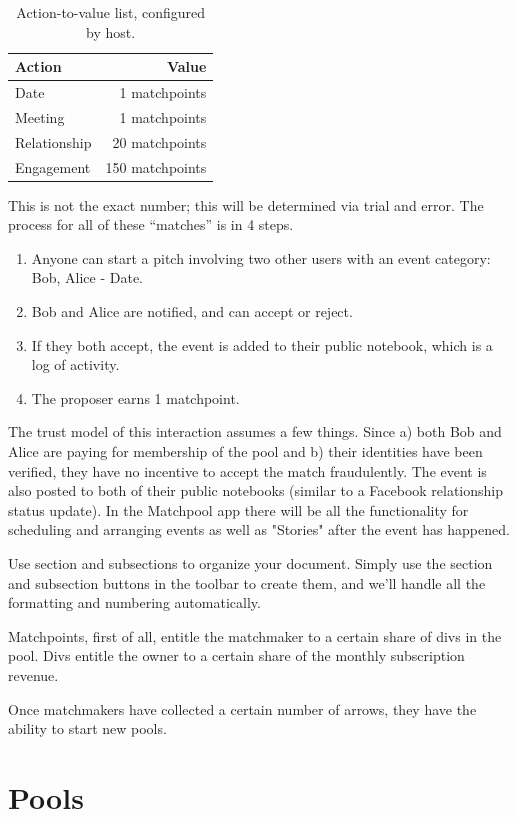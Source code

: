 \documentclass[a4paper]{article}
\begin{document}
\begin{table}[!h]
\centering
\begin{tabular}{l|r}
Action & Value \\\hline
Date & 1 matchpoints \\
Meeting & 1 matchpoints \\
Relationship & 20 matchpoints \\
Engagement & 150 matchpoints
\end{tabular}
\caption{\label{tab:widgets}Action-to-value list, configured by host.}
\end{table}

This is not the exact number; this will be determined via trial and error. The process for all of these “matches” is in 4 steps.

\begin{enumerate}
\item
Anyone can start a pitch involving two other users with an event category: Bob, Alice - Date.
\item
Bob and Alice are notified, and can accept or reject.
\item
If they both accept, the event is added to their public notebook, which is a log of activity.
\item
The proposer earns 1 matchpoint.
\end{enumerate}

The trust model of this interaction assumes a few things. Since a) both Bob and Alice are paying for membership of the pool and b) their identities have been verified, they have no incentive to accept the match fraudulently. The event is also posted to both of their public notebooks (similar to a Facebook relationship status update). In the Matchpool app there will be all the functionality for scheduling and arranging events as well as "Stories" after the event has happened.

Use section and subsections to organize your document. Simply use the section and subsection buttons in the toolbar to create them, and we'll handle all the formatting and numbering automatically.

Matchpoints, first of all, entitle the matchmaker to a certain share of divs in the pool. Divs entitle the owner to a certain share of the monthly subscription revenue.

Once matchmakers have collected a certain number of arrows, they have the ability to start new pools.

\section{Pools}
\end{document}
